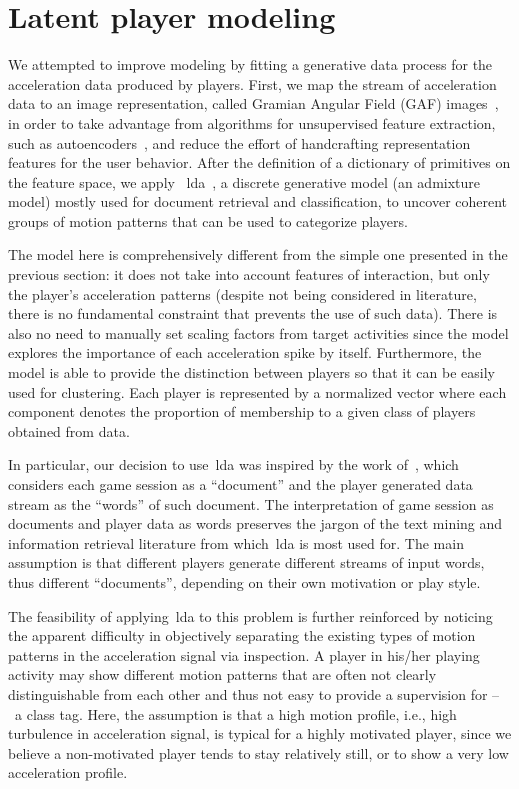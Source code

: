 \section{Latent player modeling}

We attempted to improve modeling by fitting a generative data process for the acceleration data produced by players. First, we map the stream of acceleration data to an image representation, called Gramian Angular Field (GAF) images~\citep{wang_imaging_2015}, in order to take advantage from algorithms for unsupervised feature extraction, such as autoencoders~\citep{goodfellow_deep_2016}, and reduce the effort of handcrafting representation features for the user behavior. After the definition of a dictionary of primitives on the feature space, we apply ~\acrfull{lda}~\citep{blei_latent_2003}, a discrete generative model (an admixture model) mostly used for document retrieval and classification, to uncover coherent groups of motion patterns that can be used to categorize players.

The model here is comprehensively different from the simple one presented in the previous section: it does not take into account features of interaction, but only the player's acceleration patterns (despite not being considered in literature, there is no fundamental constraint that prevents the use of such data). There is also no need to manually set scaling factors from target activities since the model explores the importance of each acceleration spike by itself. Furthermore, the model is able to provide the distinction between players so that it can be easily used for clustering. Each player is represented by a normalized vector where each component denotes the proportion of membership to a given class of players obtained from data.

In particular, our decision to use~\gls{lda} was inspired by the work of~\cite{smith_mining_2016}, which considers each game session as a ``document'' and the player generated data stream as the ``words'' of such document. The interpretation of game session as documents and player data as words preserves the jargon of the text mining and information retrieval literature from which~\gls{lda} is most used for. The main assumption is that different players generate different streams of input words, thus different ``documents'', depending on their own motivation or play style. 

The feasibility of applying~\gls{lda} to this problem is further reinforced by noticing the apparent difficulty in objectively separating the existing types of motion patterns in the acceleration signal via inspection. A player in his/her playing activity may show different motion patterns that are often not clearly distinguishable from each other and thus not easy to provide a supervision for --~\ie a class tag. Here, the assumption is that a high motion profile, i.e., high turbulence in acceleration signal, is typical for a highly motivated player, since we believe a non-motivated player tends to stay relatively still, or to show a very low acceleration profile.


